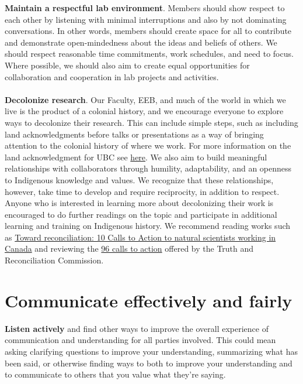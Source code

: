 \documentclass[11pt,a4paper,oneside]{article}
\begin{document}
\textbf{Maintain a respectful lab environment}. Members should show respect to each other by listening with minimal interruptions and also by not dominating conversations. In other words, members should create space for all to contribute and demonstrate open-mindedness about the ideas and beliefs of others. We should respect reasonable time commitments, work schedules, and need to focus. Where possible, we should also aim to create equal opportunities for collaboration and cooperation in lab projects and activities.\\
\\
\noindent
\textbf{Decolonize research}. Our Faculty, EEB, and much of the world in which we live is the product of a colonial history, and we encourage everyone to explore ways to decolonize their research. This can include simple steps, such as including land acknowledgments before talks or presentations as a way of bringing attention to the colonial history of where we work. For more information on the land acknowledgment for UBC see \href{https://vpfo.ubc.ca/2021/02/what-is-a-land-acknowledgement}{here}. We also aim to build meaningful relationships with collaborators through humility, adaptability, and an openness to Indigenous knowledge and values. We recognize that these relationships, however, take time to develop and require reciprocity, in addition to respect. Anyone who is interested in learning more about decolonizing their work is encouraged to do further readings on the topic and participate in additional learning and training on Indigenous history. We recommend reading works such as \href{https://www.facetsjournal.com/doi/10.1139/facets-2020-0005}{Toward reconciliation: 10 Calls to Action to natural scientists working in Canada} and reviewing the \href{http://trc.ca/assets/pdf/Calls_to_Action_English2.pdf}{96 calls to action} offered by the Truth and Reconciliation Commission.

\section{Communicate effectively and fairly}

\textbf{Listen actively} and find other ways to improve the overall experience of communication and understanding for all parties involved. This could mean asking clarifying questions to improve your understanding, summarizing what has been said, or otherwise finding ways to both to improve your understanding and to communicate to others that you value what they’re saying.
\end{document}
